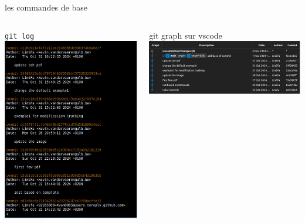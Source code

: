 \documentclass[usenames,dvipsnames]{beamer}
\begin{document}
\begin{frame}[fragile]{les commandes de base}
	\begin{columns}
		\begin{column}{0.5\linewidth}
			\lstinline|git log| \\
			\includegraphics[width=\linewidth]{Im/exemple/terminal_log.png}
		\end{column}
		\begin{column}{0.5\linewidth}
			git graph sur vscode\\
			\includegraphics[width=\linewidth]{Im/exemple/vs_log_tree.png}
		\end{column}
	\end{columns}
\end{frame}
\end{document}
